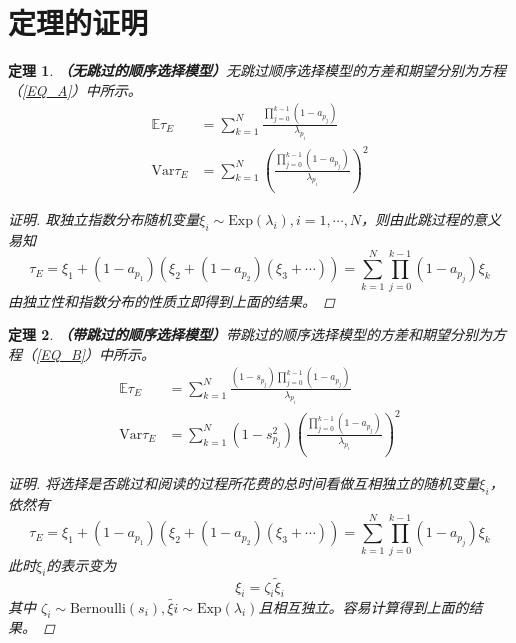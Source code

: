 \documentclass[UTF8]{ctexart}
\theoremstyle{plain}
\newtheorem{thm}{定理}[section]
\theoremstyle{definition}
\theoremstyle{remark}
\begin{document}
	\section{定理的证明}
	\begin{thm}\textbf{（无跳过的顺序选择模型）}无跳过顺序选择模型的方差和期望分别为方程（\ref{EQ_A}）中所示。
		\begin{equation*}
		\begin{aligned}
		\mathbb{E} \tau_E & = \sum_{k=1}^N \frac{\prod\limits_{j=0}^{k-1}(1-a_{p_j})}{\lambda_{p_i}} \\
		\mathrm{Var} \tau_E & = \sum_{k=1}^N \left(\frac{\prod\limits_{j=0}^{k-1}(1-a_{p_j})}{\lambda_{p_i}}\right)^2
		\end{aligned}
		\end{equation*}
	\begin{proof}[证明]
		取独立指数分布随机变量$\xi_i \sim \mathrm{Exp}(\lambda_i), i = 1, \cdots, N$，则由此跳过程的意义易知
		$$
		\tau_E = \xi_1 + (1-a_{p_1})(\xi_2 + (1-a_{p_2})(\xi_3+\cdots)) = \sum_{k=1}^N \prod_{j=0}^{k-1} (1-a_{p_j}) \xi_k
		$$
		由独立性和指数分布的性质立即得到上面的结果。
	\end{proof}
	\end{thm}
	\begin{thm}\textbf{（带跳过的顺序选择模型）}带跳过的顺序选择模型的方差和期望分别为方程（\ref{EQ_B}）中所示。
		\begin{equation*}
		\begin{aligned}
		\mathbb{E} \tau_E & = \sum_{k=1}^N \frac{(1-s_{p_j})\prod\limits_{j=0}^{k-1}(1-a_{p_j})}{\lambda_{p_i}} \\
		\mathrm{Var} \tau_E & = \sum_{k=1}^N (1-s_{p_j}^2)\left(\frac{\prod\limits_{j=0}^{k-1}(1-a_{p_j})}{\lambda_{p_i}}\right)^2
		\end{aligned}
		\end{equation*}
		\begin{proof}[证明]
			将选择是否跳过和阅读的过程所花费的总时间看做互相独立的随机变量$\xi_i$，依然有
			$$
			\tau_E = \xi_1 + (1-a_{p_1})(\xi_2 + (1-a_{p_2})(\xi_3+\cdots)) = \sum_{k=1}^N \prod_{j=0}^{k-1} (1-a_{p_j}) \xi_k
			$$
			此时$\xi_i$的表示变为
			$$
			\xi_i = \zeta_i \tilde{\xi}_i
			$$
			其中
			$\zeta_i \sim \mathrm{Bernoulli}(s_i), \tilde{\xi{i}} \sim \mathrm{Exp}(\lambda_i)$且相互独立。容易计算得到上面的结果。
		\end{proof}
	\end{thm}
\end{document}
